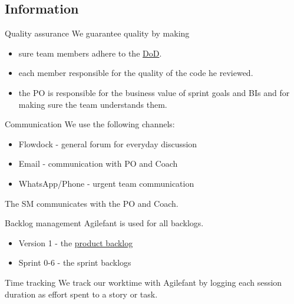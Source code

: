 \documentclass{beamer}
\begin{document}
\subsection{Information}
\begin{frame}{Quality assurance}
  We guarantee quality by making

  \begin{itemize}
  \item sure team members adhere to the \href{https://github.com/smarisa/sdpt11/raw/master/doc/definition_of_done.pdf}{DoD}.
  \item each member responsible for the quality of the code he reviewed.
  \item the PO is responsible for the business value of sprint goals and
  BIs and for making sure the team understands them.
  \end{itemize}
\end{frame}
\begin{frame}{Communication}
  We use the following channels:

  \begin{itemize}
  \item Flowdock - general forum for everyday discussion
  \item Email - communication with PO and Coach
  \item WhatsApp/Phone - urgent team communication
  \end{itemize}

  The SM communicates with the PO and Coach.
\end{frame}
\begin{frame}{Backlog management}
  Agilefant is used for all backlogs.

  \begin{itemize}
  \item Version 1 - the \href{https://cloud.agilefant.com/smarisa/editProject.action?projectId=154985}{product backlog} 
  \item Sprint 0-6 - the sprint backlogs
  \end{itemize}
\end{frame}
\begin{frame}{Time tracking}
  We track our worktime with Agilefant by logging each session
  duration as effort spent to a story or task.
\end{frame}
\end{document}
